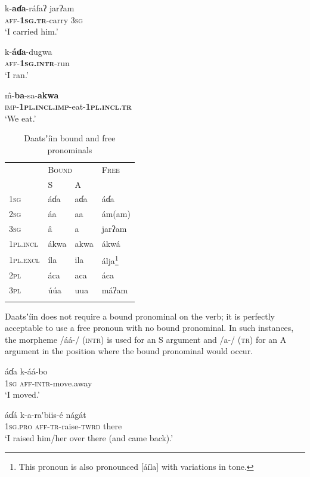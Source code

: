 \documentclass[output=paper]{langsci/langscibook}
\begin{document}
\ea\label{ex:ahlandc:16}
\gll
k-\textbf{aɗa}{}-ráfaʔ   jarʔam \\ 
\textsc{aff-}\textbf{\textsc{1sg.tr}}{}-carry  \textsc{3sg} \\
\glt
‘I carried him.’
\z

\ea\label{ex:ahlandc:17}
\gll
k-\textbf{áɗa}{}-dugwa \\
\textsc{aff-\textbf{1sg.intr}}-run   \\
\glt
‘I ran.’
\z

\ea\label{ex:ahlandc:18}
\gll
\^{m}-\textbf{ba}{}-sa-\textbf{akwa} \\
\textsc{imp-}\textbf{\textsc{1pl.incl.imp}}{}-eat-\textbf{\textsc{1pl.incl.tr}} \\
\glt
‘We eat.’
\z


\begin{table}
\begin{tabularx}{\textwidth}{XXXX}
\lsptoprule 
& \multicolumn{2}{X}{\scshape Bound} & \scshape Free\\
& S & A & \\
\midrule
\scshape 1sg & áɗa & aɗa & áɗa\\
\scshape 2sg & áa &  aa &  ám(am)\\
\scshape 3sg &  â & a &  jarʔam\\
\scshape 1pl.incl &  ákwa &  akwa &  ákwá\\
\scshape 1pl.excl & íla &  ila &  álja\footnote{This pronoun is also pronounced [áíla] with variations in tone.} \\
\scshape 2pl & áca &  aca & áca\\
\scshape 3pl & \'{u}\'{u}a & uua &  máʔam\\
\lspbottomrule
\end{tabularx}
\caption{Daatsʼíin bound and free pronominals}
\label{tab:ahlandc:4}
\end{table}

Daatsʼíin does not require a bound pronominal on the verb; it is perfectly acceptable to use a free pronoun with no bound pronominal. In such instances, the morpheme /áá-/ (\textsc{intr}) is used for an S argument  and /a-/ (\textsc{tr}) for an A argument  in the position where the bound pronominal would occur.  

\ea\label{ex:ahlandc:19}
\gll
áɗa   k-áá-bo \\
1\textsc{sg}    \textsc{aff-intr-}move.away \\
\glt
‘I moved.’
\z

\ea\label{ex:ahlandc:20}
\gll 
áɗá  k-a-ra\'{ }biis-é nágát\footnotemark \\
\textsc{1sg.pro}  \textsc{aff-tr}{}-raise-\textsc{twrd}  there \\
\glt
‘I raised him/her over there (and came back).’ 
\z 
{}
\end{document}
